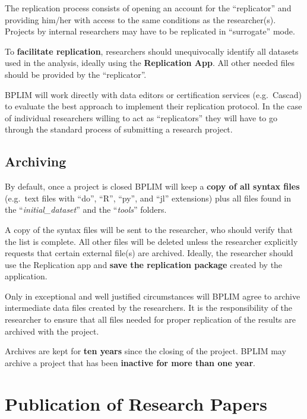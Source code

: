 \documentclass[
  a4paper,
  DIV=11,
  numbers=noendperiod]{scrartcl}
\begin{document}
The replication process consists of opening an account for the
``replicator'' and providing him/her with access to the same conditions
as the researcher(s). Projects by internal researchers may have to be
replicated in ``surrogate'' mode.

To \textbf{facilitate replication}, researchers should unequivocally
identify all datasets used in the analysis, ideally using the
\textbf{Replication App}. All other needed files should be provided by
the ``replicator''.

BPLIM will work directly with data editors or certification services
(e.g.~Cascad) to evaluate the best approach to implement their
replication protocol. In the case of individual researchers willing to
act as ``replicators'' they will have to go through the standard process
of submitting a research project.

\hypertarget{archiving}{%
\subsection{Archiving}\label{archiving}}

By default, once a project is closed BPLIM will keep a \textbf{copy of
all syntax files} (e.g.~text files with ``do'', ``R'', ``py'', and
``jl'' extensions) plus all files found in the
``\emph{initial\_dataset}'' and the ``\emph{tools}'' folders.

A copy of the syntax files will be sent to the researcher, who should
verify that the list is complete. All other files will be deleted unless
the researcher explicitly requests that certain external file(s) are
archived. Ideally, the researcher should use the Replication app and
\textbf{save the replication package} created by the application.

Only in exceptional and well justified circumstances will BPLIM agree to
archive intermediate data files created by the researchers. It is the
responsibility of the researcher to ensure that all files needed for
proper replication of the results are archived with the project.

Archives are kept for \textbf{ten years} since the closing of the
project. BPLIM may archive a project that has been \textbf{inactive for
more than one year}.

\hypertarget{publication-of-research-papers}{%
\section{Publication of Research
Papers}\label{publication-of-research-papers}}
\end{document}
